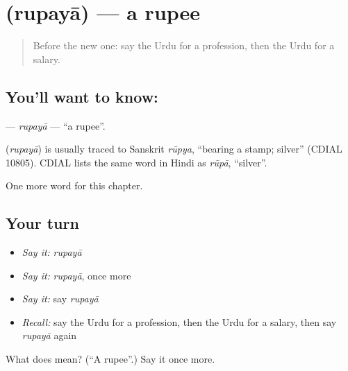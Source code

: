 \section[\texorpdfstring{\ur{روپیہ} (rupayā)}{روپیہ (rupayā)}]{ (rupayā) — a rupee}

\label{lesson:UR-C176-rupaya}



\begin{quote}
Before the new one: say the Urdu for a profession, then the Urdu for a salary.
\end{quote}

\subsection*{You'll want to know: }
\textbf{} — \emph{rupayā} — \textquotedblleft{}a rupee\textquotedblright{}.

\begin{cousinweb}
\textbf{} (\emph{rupayā}) is usually traced to Sanskrit \emph{rūpya}, \textquotedblleft{}bearing a stamp; silver\textquotedblright{} (CDIAL 10805). CDIAL lists the same word in Hindi as \emph{rūpā}, \textquotedblleft{}silver\textquotedblright{}.
\end{cousinweb}

\begin{grammarlens}[title={What you've built}]
One more word for this chapter.
\end{grammarlens}

\subsection*{Your turn}
\begin{itemize}
\raggedright
  \item \emph{Say it:} \emph{rupayā}
  \item \emph{Say it:} \emph{rupayā}, once more
  \item \emph{Say it:} say \emph{rupayā}
  \item \emph{Recall:} say the Urdu for a profession, then the Urdu for a salary, then say \emph{rupayā} again
\end{itemize}

\begin{tcolorbox}[breakable,colback=teal!4,colframe=teal!35!black,title={Before you move on}]
What does  mean? (\textquotedblleft{}A rupee\textquotedblright{}.) Say it once more.
\end{tcolorbox}
